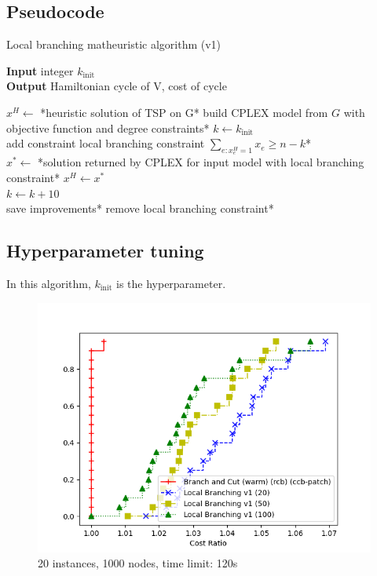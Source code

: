 \subsection{Pseudocode}
\begin{algorithm}[h]
    \caption{Local branching matheuristic algorithm (v1)}
    \hspace*{\algorithmicindent} \textbf{Input} integer $k_{\text{init}}$\\
    \hspace*{\algorithmicindent} \textbf{Output} Hamiltonian cycle of V, cost of cycle\\
    \begin{algorithmic}

        \State $x^H \gets$ *heuristic solution of TSP on G*
        \State *build CPLEX model from $G$ with objective function and degree constraints*
        \State $k\gets k_{\text{init}}$\\
        \State *add constraint local branching constraint $\sum_{e:x_e^H=1}x_e\geq n-k$*\\
        \State $x^*\gets$ *solution returned by CPLEX for input model with local branching constraint*
        \State $x^H\gets x^*$
        \EndIf\\
        \State $k\gets k+10$
        \EndIf\\
        \State *save improvements*
        \State *remove local branching constraint*
        \EndWhile

    \end{algorithmic}
\end{algorithm}
\FloatBarrier

\subsection{Hyperparameter tuning}

In this algorithm, $k_{\text{init}}$ is the hyperparameter.

\begin{figure}[h]
    \centering
    \includegraphics*[width=.6\textwidth]{../plots/perfprof_lbv1_costs.png}
    \caption*{20 instances, 1000 nodes, time limit: 120s}
\end{figure}

